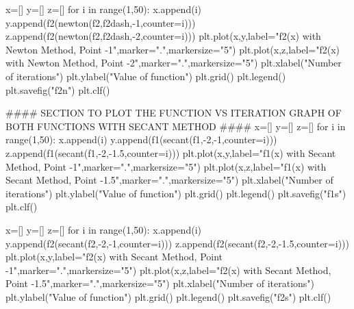 \documentclass[12pt]{article}
\begin{document}
\begin{python}
x=[]
y=[]
z=[]
for i in range(1,50):
    x.append(i)
    y.append(f2(newton(f2,f2dash,-1,counter=i)))
    z.append(f2(newton(f2,f2dash,-2,counter=i)))
plt.plot(x,y,label="f2(x) with Newton Method, Point -1",marker=".",markersize="5")
plt.plot(x,z,label="f2(x) with Newton Method, Point -2",marker=".",markersize="5")
plt.xlabel("Number of iterations")
plt.ylabel("Value of function")
plt.grid()
plt.legend()
plt.savefig("f2n")
plt.clf()


#### SECTION TO PLOT THE FUNCTION VS ITERATION GRAPH OF BOTH FUNCTIONS WITH SECANT METHOD ####
x=[]
y=[]
z=[]
for i in range(1,50):
    x.append(i)
    y.append(f1(secant(f1,-2,-1,counter=i)))
    z.append(f1(secant(f1,-2,-1.5,counter=i)))
plt.plot(x,y,label="f1(x) with Secant Method, Point -1",marker=".",markersize="5")
plt.plot(x,z,label="f1(x) with Secant Method, Point -1.5",marker=".",markersize="5")
plt.xlabel("Number of iterations")
plt.ylabel("Value of function")
plt.grid()
plt.legend()
plt.savefig("f1s")
plt.clf()

x=[]
y=[]
z=[]
for i in range(1,50):
    x.append(i)
    y.append(f2(secant(f2,-2,-1,counter=i)))
    z.append(f2(secant(f2,-2,-1.5,counter=i)))
plt.plot(x,y,label="f2(x) with Secant Method, Point -1",marker=".",markersize="5")
plt.plot(x,z,label="f2(x) with Secant Method, Point -1.5",marker=".",markersize="5")
plt.xlabel("Number of iterations")
plt.ylabel("Value of function")
plt.grid()
plt.legend()
plt.savefig("f2s")
plt.clf()

\end{python}
\end{document}
